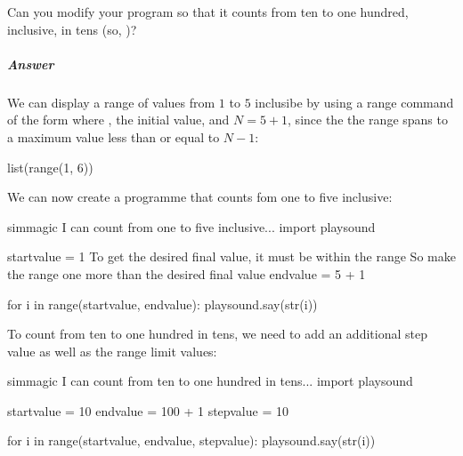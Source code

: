 \documentclass[letterpaper,10pt,english]{sphinxmanual}
\begin{document}
Can you modify your program so that it counts from ten to one hundred, inclusive, in tens (so, )?


\subparagraph{Answer}
\label{\detokenize{content/00_SOFTWARE_GUIDE/Section_00_03_quick_practical_tour:id2}}

We can display a range of values from \(1\) to \(5\) inclusibe by using a range command of the form  where , the initial value, and \(N=5+1\), since the the range spans to a maximum value less than or equal to \(N-1\):

{
\begin{sphinxVerbatim}[commandchars=\\\{\}]
\llap{\color{nbsphinxin}[ ]:\,\hspace{\fboxrule}\hspace{\fboxsep}}list(range(1, 6))
\end{sphinxVerbatim}
}

We can now create a programme that counts fom one to five inclusive:

{
\begin{sphinxVerbatim}[commandchars=\\\{\}]
\llap{\color{nbsphinxin}[ ]:\,\hspace{\fboxrule}\hspace{\fboxsep}}\PYGZpc{}\PYGZpc{}sim\PYGZus{}magic
\PYGZsh{} I can count from one to five inclusive...
import playsound

start\PYGZus{}value = 1
\PYGZsh{} To get the desired final value, it must be within the range
\PYGZsh{} So make the range one more than the desired final value
end\PYGZus{}value = 5 + 1

for i in range(start\PYGZus{}value, end\PYGZus{}value):
    playsound.say(str(i))
\end{sphinxVerbatim}
}

To count from ten to one hundred in tens, we need to add an additional step value as well as the range limit values:

{
\begin{sphinxVerbatim}[commandchars=\\\{\}]
\llap{\color{nbsphinxin}[ ]:\,\hspace{\fboxrule}\hspace{\fboxsep}}\PYGZpc{}\PYGZpc{}sim\PYGZus{}magic
\PYGZsh{} I can count from ten to one hundred in tens...
import playsound

start\PYGZus{}value = 10
end\PYGZus{}value = 100 + 1
step\PYGZus{}value = 10

for i in range(start\PYGZus{}value, end\PYGZus{}value, step\PYGZus{}value):
    playsound.say(str(i))
\end{sphinxVerbatim}
}
\end{document}
